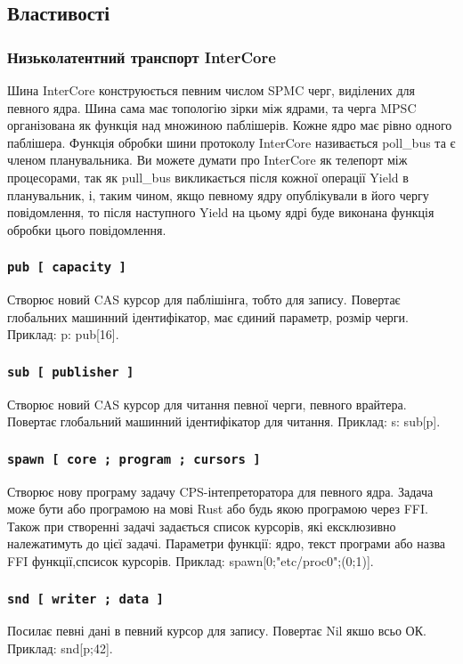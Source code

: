 \begin{definition}
\begin{definition}
\begin{definition}
\begin{definition}
\subsection{Властивості}

\subsubsection{Низьколатентний транспорт InterCore}

Шина InterCore конструюється певним числом SPMC черг, виділених для певного ядра.
Шина сама має топологію зірки між ядрами, та черга MPSC організована
як функція над множиною паблішерів. Кожне ядро має рівно одного паблішера.
Функція обробки шини протоколу InterCore називається poll\_bus та є членом планувальника.
Ви можете думати про InterCore як телепорт між процесорами, так як pull\_bus
викликається після кожної операції Yield в планувальник, і, таким чином,
якщо певному ядру опублікували в його чергу повідомлення, то після наступного Yield
на цьому ядрі буде виконана функція обробки цього повідомлення.

\subsubsection*{\lstinline{pub [ capacity ]}}
Створює новий CAS курсор для паблішінга, тобто для запису.
Повертає глобальних машинний ідентифікатор, має єдиний параметр, розмір черги.
Приклад: p: pub[16].

\subsubsection*{\lstinline{sub [ publisher ]}}
Створює новий CAS курсор для читання певної черги, певного врайтера.
Повертає глобальний машинний ідентифікатор для читання.
Приклад: s: sub[p].

\subsubsection*{\lstinline{spawn [ core ; program ; cursors ]}}
Створює нову програму задачу CPS-інтепреторатора для певного ядра.
Задача може бути або програмою на мові Rust або будь якою програмою через FFI.
Також при створенні задачі задається список курсорів,
які ексклюзивно належатимуть до цієї задачі.
Параметри функції: ядро, текст програми або назва FFI функції,спсисок курсорів.
Приклад: spawn[0;"etc/proc0";(0;1)].

\subsubsection*{\lstinline{snd [ writer ; data ]}}
Посилає певні дані в певний курсор для запису. Повертає Nil якшо всьо ОК.
Приклад: snd[p;42].


\end{definition}
\end{definition}
\end{definition}
\end{definition}
